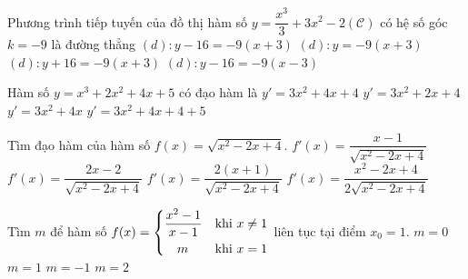 \begin{ex}%
	Phương trình tiếp tuyến của đồ thị hàm số $y=\dfrac{x^3}{3}+3x^2-2 (\mathcal{C})$ có hệ số góc $k=-9$ là đường thẳng
	\choice
	{\True $(d): y-16=-9(x+3)$}
	{$(d): y=-9(x+3)$}
	{$(d): y+16=-9(x+3)$}
	{$(d): y-16=-9(x-3)$}
\end{ex}


\begin{ex}%
	Hàm số $y=x^3+2x^2+4x+5$ có đạo hàm là
	\choice
	{\True $y'=3x^2+4x+4$}
	{$y'=3x^2+2x+4$}
	{$y'=3x^2+4x$}
	{$y'=3x^2+4x+4+5$}
	
\end{ex}


\begin{ex}%
	Tìm đạo hàm của hàm số $f(x)=\sqrt{x^2-2x+4}$.
	\choice
	{\True $f'(x) = \dfrac{x-1}{\sqrt{x^2-2x+4}}$}
	{$f'(x) = \dfrac{2x-2}{\sqrt{x^2-2x+4}}$}
	{$f'(x) = \dfrac{2(x+1)}{\sqrt{x^2-2x+4}}$ }
	{$f'(x) = \dfrac{x^2-2x+4}{2\sqrt{x^2-2x+4}}$}
\end{ex}


\begin{ex}%
	Tìm $m$ để hàm số $f(x)=\left\{\begin{aligned}& \dfrac{x^2-1}{x-1} & \text{khi }  x \ne 1 \\ & \ \ \ m & \text{khi }  x =1\end{aligned}\right.$ liên tục tại điểm $x_0=1$.
	\choice
	{$m=0$}
	{$m=1$}
	{$m=-1$}
	{\True $m=2$}
\end{ex}


